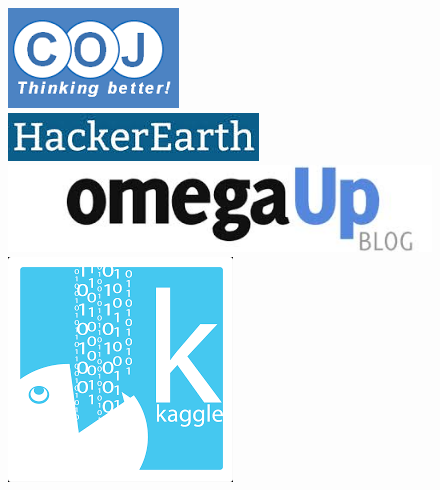 \documentclass{beamer}
\begin{document}
\begin{frame}
\begin{figure}[!htb]
      \href{http://coj.uci.cu/index.xhtml}{\includegraphics[width=\linewidth]{images/judges/coj}}
     \endminipage\hfill
     \href{https://www.hackerearth.com/}{ \includegraphics[width=\linewidth]{images/judges/hackerearth}}
     \endminipage\hfill
     \href{https://omegaup.com/}{ \includegraphics[width=\linewidth]{images/judges/omegaup}}
     \endminipage\hfill
     \href{https://www.kaggle.com/}{ \includegraphics[width=\linewidth]{images/judges/kaggle}}%
     \endminipage\hfill
	\end{figure}
\end{frame}
\end{document}
